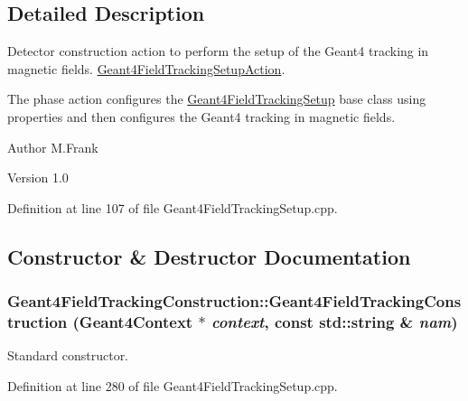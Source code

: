 \subsection{Detailed Description}
Detector construction action to perform the setup of the Geant4 tracking in magnetic fields. \hyperlink{class_d_d4hep_1_1_simulation_1_1_geant4_field_tracking_setup_action}{Geant4FieldTrackingSetupAction}.

The phase action configures the \hyperlink{struct_d_d4hep_1_1_simulation_1_1_geant4_field_tracking_setup}{Geant4FieldTrackingSetup} base class using properties and then configures the Geant4 tracking in magnetic fields.

\begin{DoxyAuthor}{Author}
M.Frank 
\end{DoxyAuthor}
\begin{DoxyVersion}{Version}
1.0 
\end{DoxyVersion}


Definition at line 107 of file Geant4FieldTrackingSetup.cpp.

\subsection{Constructor \& Destructor Documentation}
\hypertarget{class_d_d4hep_1_1_simulation_1_1_geant4_field_tracking_construction_a30d46b332f2f91ec1f9923bc097812b3}{
\subsubsection[{Geant4FieldTrackingConstruction}]{\setlength{\rightskip}{0pt plus 5cm}Geant4FieldTrackingConstruction::Geant4FieldTrackingConstruction ({\bf Geant4Context} $\ast$ {\em context}, \/  const std::string \& {\em nam})}}
\label{class_d_d4hep_1_1_simulation_1_1_geant4_field_tracking_construction_a30d46b332f2f91ec1f9923bc097812b3}


Standard constructor. 

Definition at line 280 of file Geant4FieldTrackingSetup.cpp.

